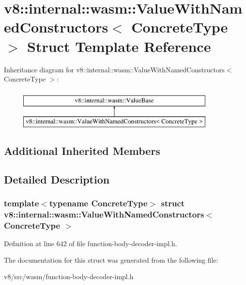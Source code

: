 \hypertarget{structv8_1_1internal_1_1wasm_1_1ValueWithNamedConstructors}{}\section{v8\+:\+:internal\+:\+:wasm\+:\+:Value\+With\+Named\+Constructors$<$ Concrete\+Type $>$ Struct Template Reference}
\label{structv8_1_1internal_1_1wasm_1_1ValueWithNamedConstructors}
Inheritance diagram for v8\+:\+:internal\+:\+:wasm\+:\+:Value\+With\+Named\+Constructors$<$ Concrete\+Type $>$\+:\begin{figure}[H]
\begin{center}
\leavevmode
\includegraphics[height=2.000000cm]{structv8_1_1internal_1_1wasm_1_1ValueWithNamedConstructors}
\end{center}
\end{figure}
\subsection*{Additional Inherited Members}


\subsection{Detailed Description}
\subsubsection*{template$<$typename Concrete\+Type$>$\newline
struct v8\+::internal\+::wasm\+::\+Value\+With\+Named\+Constructors$<$ Concrete\+Type $>$}



Definition at line 642 of file function-\/body-\/decoder-\/impl.\+h.



The documentation for this struct was generated from the following file\+:\begin{DoxyCompactItemize}
\item 
v8/src/wasm/function-\/body-\/decoder-\/impl.\+h\end{DoxyCompactItemize}
